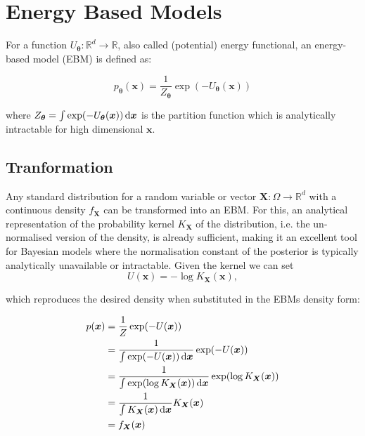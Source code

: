 

\begin{comment}
Let $\bm{x} \sim p_{\text{data}}(\bm{x})$ denote a training example, and $p_{\bm{\theta}}(\bm{x})$ denote a model’s probability density function 
that aims to approximates $p_{\text{data}}(\bm{x})$. 
\end{comment}


\section{Energy Based Models}

For a function $U_{\bm{\theta}} : \mathbb{R}^d \to \mathbb{R}$, also called (potential) energy functional, an energy-based model (EBM) is defined as:

\[
	p_{\bm{\theta}} (\bm{x}) = \frac{1}{ Z_{\bm{\theta}} } \exp( - U_{\bm{\theta}} (\bm{x}) )
\]

where $Z_{\bm{\theta}} = \int \exp( - U_{\bm{\theta}} (\bm{x}) ) \mathop{}\!\mathrm{d} \bm{x}$ is the partition function which is analytically intractable for high dimensional $\bm{x}$.



\subsection{Tranformation}
Any standard distribution for a random variable or vector $\bm{X} : \Omega \to \mathbb{R}^d$ with a continuous density $f_{\bm{X}}$ can be transformed into an EBM.
For this, an analytical representation of the probability kernel $K_{\bm{X}}$ of the distribution, i.e. the un-normalised version of the density, is already sufficient, 
making it an excellent tool for Bayesian models where the normalisation constant of the posterior is typically analytically unavailable or intractable.
Given the kernel we can set 
\[
	U(\bm{x}) = - \log K_{\bm{X}} (\bm{x}),
\]

which reproduces the desired density when substituted in the EBMs density form:

\[
\begin{aligned}
	p (\bm{x}) &= \frac{1}{ Z } \exp( - U(\bm{x}) ) \\
	&= \frac{1}{ \int \exp( - U (\bm{x}) ) \mathop{}\!\mathrm{d} \bm{x} } \exp( - U(\bm{x}) ) \\
	&= \frac{1}{ \int \exp( \log K_{\bm{X}} (\bm{x}) ) \mathop{}\!\mathrm{d} \bm{x} } \exp( \log K_{\bm{X}} (\bm{x}) ) \\
	&= \frac{1}{ \int K_{\bm{X}} (\bm{x}) \mathop{}\!\mathrm{d} \bm{x} } K_{\bm{X}} (\bm{x}) \\
	&= f_{\bm{X}} (\bm{x}) \\
\end{aligned}
\]

